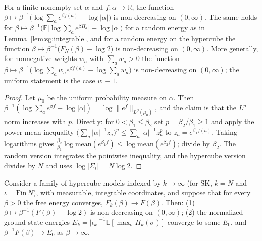 \begin{lemma}\label{lem:sg:lyapunov}
  \leanok
For a finite nonempty set $\alpha$ and $f:\alpha\to\mathbb R$, the function
$\beta\mapsto\beta^{-1}\big(\log\sum_ae^{\beta f(a)}-\log|\alpha|\big)$ is non-decreasing on $(0,\infty)$. The same
holds for $\beta\mapsto\beta^{-1}\big(\mathbb E\big[\log\sum_ae^{\beta H_a}\big]-\log|\alpha|\big)$ for a random energy as in
Lemma~\ref{lem:sg:integrable}, and for a random energy on the hypercube the function
$\beta\mapsto\beta^{-1}\big(F_N(\beta)-\log2\big)$ is non-decreasing on $(0,\infty)$. More generally, for nonnegative weights
$w_a$ with $\sum_aw_a>0$ the function $\beta\mapsto\beta^{-1}\big(\log\sum_aw_ae^{\beta f(a)}-\log\sum_aw_a\big)$ is
non-decreasing on $(0,\infty)$; the uniform statement is the case $w\equiv1$.
\end{lemma}

\begin{proof}
  \leanok
Let $\mu_0$ be the uniform probability measure on $\alpha$. Then $\beta^{-1}(\log\sum_ae^{\beta f}-\log|\alpha|)=
\log\|e^f\|_{L^\beta(\mu_0)}$, and the claim is that the $L^p$ norm increases with $p$. Directly: for
$0<\beta_1\le\beta_2$ set $p=\beta_2/\beta_1\ge1$ and apply the power-mean inequality
$\big(\sum_a|\alpha|^{-1}z_a\big)^p\le\sum_a|\alpha|^{-1}z_a^p$ to $z_a=e^{\beta_1f(a)}$. Taking logarithms gives
$\frac{\beta_2}{\beta_1}\log\mathrm{mean}(e^{\beta_1f})\le\log\mathrm{mean}(e^{\beta_2f})$; divide by $\beta_2$. The
random version integrates the pointwise inequality, and the hypercube version divides by $N$ and uses
$\log|\Sigma_\iota|=N\log2$.
\end{proof}

\begin{theorem}\label{thm:sg:zerotemp}
  \leanok
Consider a family of hypercube models indexed by $k\to\infty$ (for SK, $k=N$ and $\iota=\mathrm{Fin}\,N$), with
measurable, integrable coordinates, and suppose that for every $\beta>0$ the free energy converges,
$F_k(\beta)\to F(\beta)$. Then:
(1) $\beta\mapsto\beta^{-1}(F(\beta)-\log2)$ is non-decreasing on $(0,\infty)$;
(2) the normalized ground-state energies $E_k=|\iota_k|^{-1}\mathbb E[\max_\sigma H_k(\sigma)]$ converge to some $E_0$, and
$\beta^{-1}F(\beta)\to E_0$ as $\beta\to\infty$.
\end{theorem}


